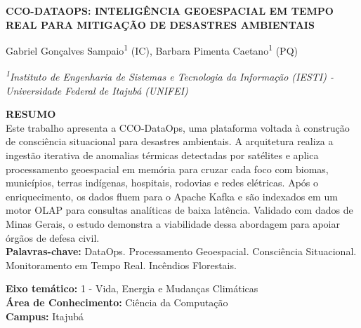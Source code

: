 \documentclass[12pt,a4paper]{article}
\newif\ifanonymous
\begin{document}
\begin{singlespace}
\begin{center}
\textbf{CCO-DATAOPS: INTELIGÊNCIA GEOESPACIAL EM TEMPO REAL PARA MITIGAÇÃO DE DESASTRES AMBIENTAIS}

\vspace{0.55cm}
\ifanonymous
\else
  Gabriel Gonçalves Sampaio\textsuperscript{1} (IC), Barbara Pimenta Caetano\textsuperscript{1} (PQ)

  \vspace{0.15cm}
  {\fontsize{9}{11}\selectfont\itshape
  \textsuperscript{1}Instituto de Engenharia de Sistemas e Tecnologia da Informação (IESTI) - Universidade Federal de Itajubá (UNIFEI)}
\fi
\end{center}
\end{singlespace}

\begin{singlespace}
\noindent\textbf{RESUMO}\\
Este trabalho apresenta a CCO-DataOps, uma plataforma voltada à construção de consciência situacional para desastres ambientais. A arquitetura realiza a ingestão iterativa de anomalias térmicas detectadas por satélites e aplica processamento geoespacial em memória para cruzar cada foco com biomas, municípios, terras indígenas, hospitais, rodovias e redes elétricas. Após o enriquecimento, os dados fluem para o Apache Kafka e são indexados em um motor OLAP para consultas analíticas de baixa latência. Validado com dados de Minas Gerais, o estudo demonstra a viabilidade dessa abordagem para apoiar órgãos de defesa civil.\\
\textbf{Palavras-chave:} DataOps. Processamento Geoespacial. Consciência Situacional. Monitoramento em Tempo Real. Incêndios Florestais.

\vspace{\baselineskip}
\noindent\textbf{Eixo temático:} 1 - Vida, Energia e Mudanças Climáticas\\
\textbf{Área de Conhecimento:} Ciência da Computação\\
\textbf{Campus:} Itajubá
\end{singlespace}

\vspace{0.3cm}








\end{document}
